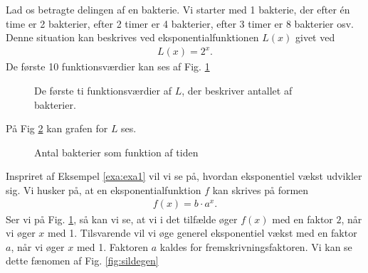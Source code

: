 \begin{exa}\label{exa:exa1}
Lad os betragte delingen af en bakterie. Vi starter med 1 bakterie, der efter én time er 2 bakterier, efter 2 timer er 4 bakterier, efter 3 timer er 8 bakterier osv. Denne situation kan beskrives ved eksponentialfunktionen $L(x)$ givet ved
\begin{align*}
L(x) = 2^x.
\end{align*}
De første 10 funktionsværdier kan ses af Fig. \ref{fig:sildebenfold}
\begin{figure}[H]
\center
{}
\caption{De første ti funktionsværdier af $L$, der beskriver antallet af bakterier. }
\label{fig:sildebenfold}
\end{figure}
På Fig \ref{fig:flagxfold} kan grafen for $L$ ses. 
\begin{figure}[H]
\center
{}
\caption{Antal bakterier som funktion af tiden}
\label{fig:flagxfold}
\end{figure}
\end{exa}
Inspriret af Eksempel \ref{exa:exa1} vil vi se på, hvordan eksponentiel vækst udvikler sig. Vi husker på, at en eksponentialfunktion $f$ kan skrives på formen
\begin{align*}
f(x) = b\cdot a^x.
\end{align*}
Ser vi på Fig. \ref{fig:sildebenfold}, så kan vi se, at vi i det tilfælde øger $f(x)$ med en faktor $2$, når vi øger $x$ med 1. Tilsvarende vil vi øge generel eksponentiel vækst med en faktor $a$, når vi øger $x$ med 1. Faktoren $a$ kaldes for fremskrivningsfaktoren. Vi kan se dette fænomen af Fig. \ref{fig:sildegen}
